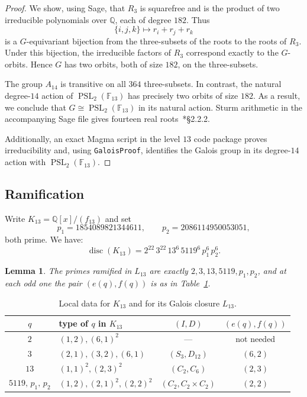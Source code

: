 \documentclass[10pt]{amsart}
\numberwithin{equation}{section}
\newcommand{\Disc}{\operatorname{disc}}
\newtheorem{lemma}[theorem]{Lemma}
\theoremstyle{definition}
\theoremstyle{remark}
\newcommand{\F}{\mathbb{F}}
\newcommand{\Q}{\mathbb{Q}}
\newcommand{\PSL}{\operatorname{PSL}}
\begin{document}
\begin{proof}
We show, using Sage, that $R_3$ is squarefree and is the product
of two irreducible polynomials over $\Q$, each of degree $182$.
Thus
\[
 \{i,j,k\}\longmapsto r_i+r_j+r_k
\]
is a $G$-equivariant bijection from the three-subsets of the roots to the
roots of $R_3$.  Under this bijection, the irreducible factors of $R_3$
correspond exactly to the $G$-orbits.  Hence $G$ has two orbits, both of size
$182$, on the three-subsets.

The group $A_{14}$ is transitive on all $364$
three-subsets.  In contrast, the natural degree-$14$ action of $\PSL_2(\F_{13})$ has precisely two orbits of size $182$.  As a result, we conclude
that $G\cong\PSL_2(\F_{13})$ in its natural action. Sturm arithmetic in the accompanying
Sage file gives fourteen real roots~\cite{BasuPollackRoy2006}*{\S2.2.2}. 


Additionally, an exact Magma script in the level $13$
code package proves irreducibility and, using \texttt{GaloisProof},
identifies the Galois group in its degree-$14$ action with
$\PSL_2(\F_{13})$. 
\end{proof}

\subsection{Ramification}\label{subsec:l13-local}
Write $K_{13}=\Q[x]/(f_{13})$ and set
\[
 p_1=1854089821344611,\qquad p_2=2086114950053051 ,
\]
both prime.  We have:
\begin{equation}\label{eq:l13-field-discriminant}
 \Disc(K_{13})=2^{22}\,3^{22}\,13^{6}\,5119^{6}\,p_1^{6}\,p_2^{6} .
\end{equation}

\begin{lemma}\label{lem:l13-local}
The primes ramified in $L_{13}$ are exactly $2,3,13,5119,p_1,p_2$, and at
each odd one the pair $(e(q),f(q))$ is as in Table~\textup{\ref{tab:l13-local}}.
\end{lemma}

\begin{table}[ht]
\centering
\begin{tabular}{@{}clcc@{}}
\toprule
$q$ & type of $q$ in $K_{13}$ & $(I,D)$ & $(e(q),f(q))$\\
\midrule
$2$ & $(1,2),(6,1)^2$ & --- & not needed\\
$3$ & $(2,1),(3,2),(6,1)$ & $(S_3,D_{12})$ & $(6,2)$\\
$13$ & $(1,1)^2,(2,3)^2$ & $(C_2,C_6)$ & $(2,3)$\\
$5119,\,p_1,\,p_2$ & $(1,2),(2,1)^2,(2,2)^2$
 & $(C_2,C_2\times C_2)$ & $(2,2)$\\
\bottomrule
\end{tabular}
\caption{Local data for $K_{13}$ and for its Galois closure $L_{13}$.}
\label{tab:l13-local}
\end{table}
\end{document}
